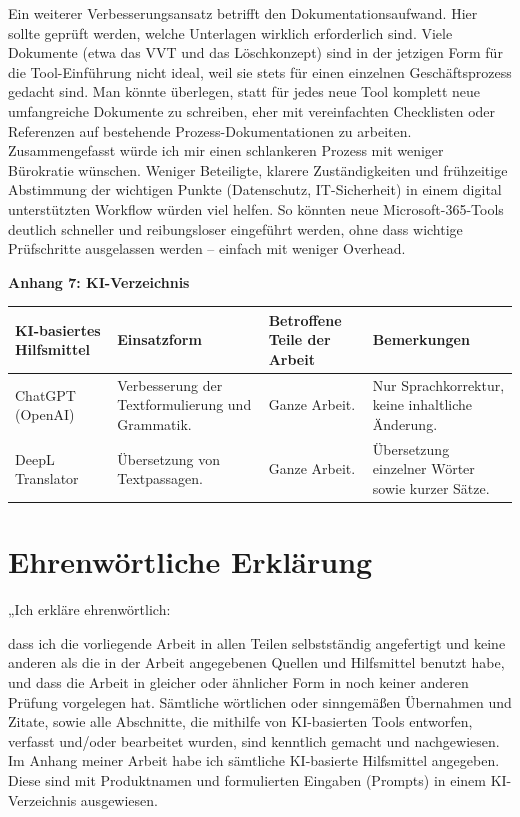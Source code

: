 \documentclass[
    12pt, 
    a4paper,
    ]{scrartcl} %
\begin{document}
Ein weiterer Verbesserungsansatz betrifft den Dokumentationsaufwand. Hier sollte geprüft werden, welche Unterlagen wirklich erforderlich sind. Viele Dokumente (etwa das VVT und das Löschkonzept) sind in der jetzigen Form für die Tool-Einführung nicht ideal, weil sie stets für einen einzelnen Geschäftsprozess gedacht sind. Man könnte überlegen, statt für jedes neue Tool komplett neue umfangreiche Dokumente zu schreiben, eher mit vereinfachten Checklisten oder Referenzen auf bestehende Prozess-Dokumentationen zu arbeiten. Zusammengefasst würde ich mir einen schlankeren Prozess mit weniger Bürokratie wünschen. Weniger Beteiligte, klarere Zuständigkeiten und frühzeitige Abstimmung der wichtigen Punkte (Datenschutz, IT-Sicherheit) in einem digital unterstützten Workflow würden viel helfen. So könnten neue Microsoft-365-Tools deutlich schneller und reibungsloser eingeführt werden, ohne dass wichtige Prüfschritte ausgelassen werden – einfach mit weniger Overhead.

\newpage
{}
{}
\label{sec:Anhang7}

{\Large\bfseries Anhang 7: KI-Verzeichnis}\\[0.6cm]

\begin{tabular}{|p{3.2cm}|p{5.2cm}|p{4.2cm}|p{3.2cm}|}
    \hline
    \textbf{KI-basiertes Hilfsmittel} & \textbf{Einsatzform} & \textbf{Betroffene Teile der Arbeit} & \textbf{Bemerkungen} \\
    \hline
    ChatGPT (OpenAI) & Verbesserung der Textformulierung und Grammatik. & Ganze Arbeit. & Nur Sprachkorrektur, keine inhaltliche Änderung. \\
    \hline
    DeepL Translator & Übersetzung von Textpassagen. & Ganze Arbeit. & Übersetzung einzelner Wörter sowie kurzer Sätze. \\
    \hline
\end{tabular}

\newpage
\section*{Ehrenwörtliche Erklärung}
{}

„Ich erkläre ehrenwörtlich:

dass ich die vorliegende Arbeit in allen Teilen selbstständig angefertigt und keine anderen als
die in der Arbeit angegebenen Quellen und Hilfsmittel benutzt habe, und dass die Arbeit in
gleicher oder ähnlicher Form in noch keiner anderen Prüfung vorgelegen hat. Sämtliche wörtlichen oder sinngemäßen Übernahmen und Zitate, sowie alle Abschnitte, die mithilfe von KI-basierten Tools entworfen, verfasst und/oder bearbeitet wurden, sind kenntlich gemacht und
nachgewiesen. Im Anhang meiner Arbeit habe ich sämtliche KI-basierte Hilfsmittel angegeben.
Diese sind mit Produktnamen und formulierten Eingaben (Prompts) in einem KI-Verzeichnis
ausgewiesen.
\end{document}
